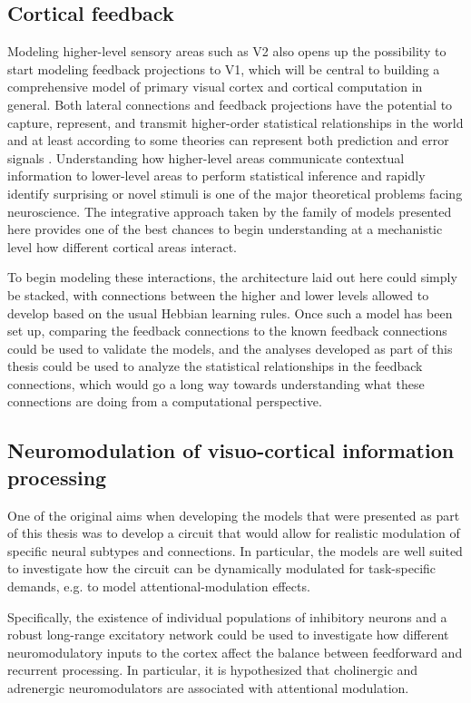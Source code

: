 \subsection{Cortical feedback}

Modeling higher-level sensory areas such as V2 also opens up the
possibility to start modeling feedback projections to V1, which will
be central to building a comprehensive model of primary visual cortex
and cortical computation in general. Both lateral connections and
feedback projections have the potential to capture, represent, and
transmit higher-order statistical relationships in the world and at
least according to some theories can represent both prediction and
error signals \citep{Rao1999, Spratling2011}. Understanding how
higher-level areas communicate contextual information to lower-level
areas to perform statistical inference and rapidly identify surprising
or novel stimuli is one of the major theoretical problems facing
neuroscience.  The integrative approach taken by the family of
models presented here provides one of the best chances to begin
understanding at a mechanistic level how different cortical areas
interact.

To begin modeling these interactions, the architecture laid out here
could simply be stacked, with connections between the higher and lower levels
allowed to develop based on the usual Hebbian learning rules. Once
such a model has been set up, comparing the feedback connections to the
known feedback connections could be used to validate the models, and
the analyses developed as part of this thesis could be used to
analyze the statistical relationships in the feedback connections, which would go
a long way towards understanding what these connections are doing from
a computational perspective.

\subsection{Neuromodulation of visuo-cortical information processing}

One of the original aims when developing the models that were
presented as part of this thesis was to develop a circuit that would
allow for realistic modulation of specific neural subtypes and
connections. In particular, the models are well suited to investigate
how the circuit can be dynamically modulated for task-specific
demands, e.g. to model attentional-modulation effects.

Specifically, the existence of individual populations of inhibitory
neurons and a robust long-range excitatory network could be used to
investigate how different neuromodulatory inputs to the cortex affect
the balance between feedforward and recurrent processing. In
particular, it is hypothesized that cholinergic and adrenergic
neuromodulators are associated with attentional modulation.

